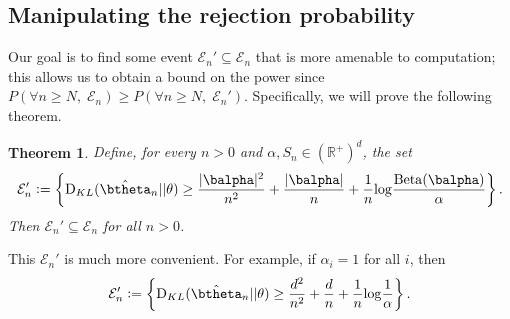 \documentclass[11pt]{article}
\def\log{{\rm log}}
\newcommand{\Reals}{\mathbb R}
\newcommand{\Beta}{\mathrm{Beta}}
\newcommand{\KL}{\mathrm{D}_{KL}}
\newtheorem{thm}{Theorem}[section]
\newcommand{\df}{\vcentcolon=}
\begin{document}
\subsection{Manipulating the rejection probability}
Our goal is to find some event $\mathcal E_n'\subseteq \mathcal E_n$ that is more amenable to computation; this allows us to obtain a bound on the power since
$P(\forall n \geq N,\; \mathcal E_n) \geq P(\forall n \geq N,\; \mathcal E_n')$.  Specifically, we will prove the following theorem.
\begin{thm}\label{thm:calEprime}
Define, for every $n>0$ and $\alpha, S_n\in(\Reals^+)^d$, the set
\begin{equation}
  \label{eq:decision_boundary}
  \mathcal E_n'\df
  \left\{
    \KL(\hat\btheta_n|| \theta)
    \geq
      \frac{|\balpha|^2}{n^2} + \frac{|\balpha|}{n}
    +\frac{1}{n}\log\frac{\Beta(\balpha)}{\alpha}
  \right\}.
\end{equation}
Then $\mathcal E_n' \subseteq \mathcal E_n$ for all $n>0$. 
\end{thm}
This $\mathcal E_n'$ is much more convenient. For example, if $\alpha_i = 1$ for all $i$, then 
\begin{equation*}
  \mathcal E_n'\df
  \left\{
    \KL(\hat\btheta_n|| \theta)
    \geq
    \frac{d^2}{n^2}
    +\frac{d}{n}
    +\frac{1}{n}\log\frac{1}{\alpha}
  \right\}.
\end{equation*}
\end{document}
